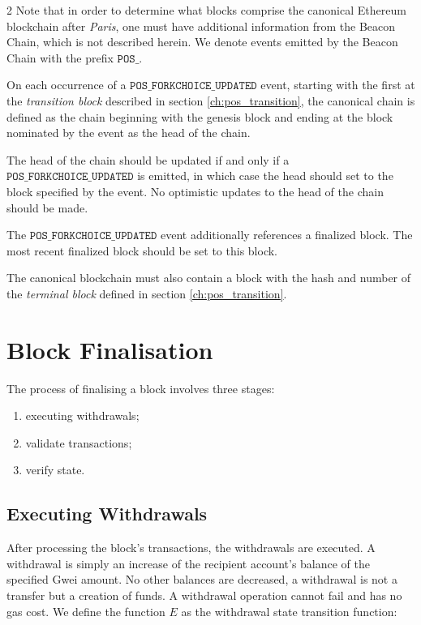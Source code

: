 \documentclass[9pt,oneside]{amsart}
\begin{document}
\begin{multicols}{2}
Note that in order to determine what blocks comprise the canonical Ethereum blockchain after \textit{Paris}, one must have additional information from the Beacon Chain, which is not described herein. We denote events emitted by the Beacon Chain with the prefix $\mathtt{POS\_}$.

On each occurrence of a $\mathtt{POS\_FORKCHOICE\_UPDATED}$ event, starting with the first at the \textit{transition block} described in section \ref{ch:pos_transition}, the canonical chain is defined as the chain beginning with the genesis block and ending at the block nominated by the event as the head of the chain.

The head of the chain should be updated if and only if a $\mathtt{POS\_FORKCHOICE\_UPDATED}$ is emitted, in which case the head should set to the block specified by the event.
No optimistic updates to the head of the chain should be made.

The $\mathtt{POS\_FORKCHOICE\_UPDATED}$ event additionally references a finalized block.
The most recent finalized block should be set to this block.

The canonical blockchain must also contain a block with the hash and number of the \textit{terminal block} defined in section \ref{ch:pos_transition}.

\section{Block Finalisation} \label{ch:finalisation}

The process of finalising a block involves three stages:

\begin{enumerate}
\item executing withdrawals;
\item validate transactions;
\item verify state.
\end{enumerate}

\subsection{Executing Withdrawals}
After processing the block's transactions, the withdrawals are executed. A withdrawal is simply an increase of the recipient account's balance of the specified Gwei amount. No other balances are decreased, a withdrawal is not a transfer but a creation of funds.
A withdrawal operation cannot fail and has no gas cost. We define the function $E$ as the withdrawal state transition function:


\end{multicols}
\end{document}
